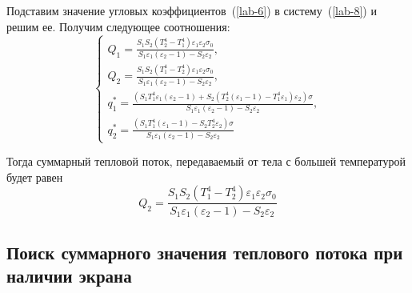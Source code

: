 \documentclass[12pt, a4paper]{article}
\begin{document}
Подставим значение угловых коэффициентов~(\ref{lab-6}) в систему~(\ref{lab-8}) и решим ее. Получим следующее соотношения:
\begin{equation*}
	\begin{cases}
		Q_1 = \frac{S_1 S_2 (T_2^4 - T_1^4) \varepsilon_1  \varepsilon_2 \sigma_0}{S_1 \varepsilon_1 (\varepsilon_2 - 1) - S_2 \varepsilon_2}, \\
		Q_2 = \frac{S_1 S_2 (T_1^4 - T_2^4) \varepsilon_1  \varepsilon_2 \sigma_0}{S_1 \varepsilon_1 (\varepsilon_2 - 1) - S_2 \varepsilon_2}, \\
		q_1^{*} = \frac{(S_1 T_1^4 \varepsilon_1 (\varepsilon_2 - 1) + S_2 (T_2^4 (\varepsilon_1 - 1) - T_1^4 \varepsilon_1)\varepsilon_2)\sigma}{S_1 \varepsilon_1 (\varepsilon_2 - 1) - S_2 \varepsilon_2}, \\
		q_2^{*} = \frac{(S_1 T_1^4 (\varepsilon_1 - 1) - S_2 T_2^4 \varepsilon_2)\sigma}{S_1 \varepsilon_1 (\varepsilon_2 - 1) - S_2 \varepsilon_2}
	\end{cases}
\end{equation*}

Тогда суммарный тепловой поток, передаваемый от тела с большей температурой будет равен
\[
Q_2 = \frac{S_1 S_2 (T_1^4 - T_2^4) \varepsilon_1  \varepsilon_2 \sigma_0}{S_1 \varepsilon_1 (\varepsilon_2 - 1) - S_2 \varepsilon_2}
\]

\subsection{Поиск суммарного значения теплового потока при наличии экрана}
\end{document}

